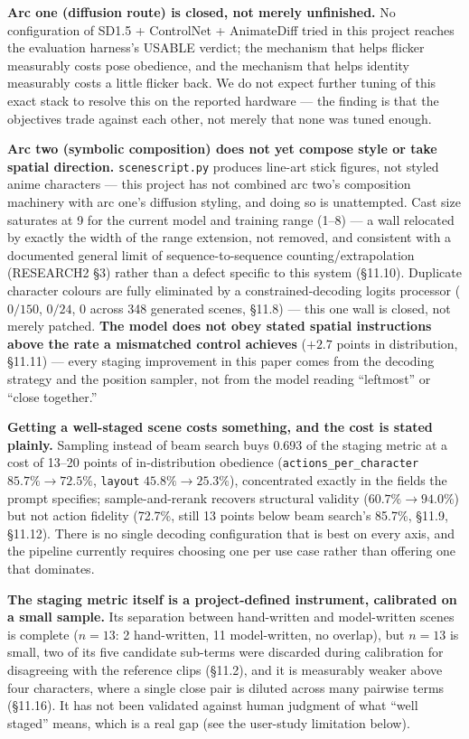 \documentclass[11pt]{article}
\newcommand{\secsym}{\S}
\begin{document}
\textbf{Arc one (diffusion route) is closed, not merely unfinished.} No
configuration of SD1.5 + ControlNet + AnimateDiff tried in this project
reaches the evaluation harness's USABLE verdict; the mechanism that helps
flicker measurably costs pose obedience, and the mechanism that helps
identity measurably costs a little flicker back. We do not expect further
tuning of this exact stack to resolve this on the reported hardware ---
the finding is that the objectives trade against each other, not merely
that none was tuned enough.

\textbf{Arc two (symbolic composition) does not yet compose style or
take spatial direction.} \texttt{scenescript.py} produces line-art stick
figures, not styled anime characters --- this project has not combined
arc two's composition machinery with arc one's diffusion styling, and
doing so is unattempted. Cast size saturates at 9 for the current model
and training range (1--8) --- a wall relocated by exactly the width of
the range extension, not removed, and consistent with a documented
general limit of sequence-to-sequence counting/extrapolation (RESEARCH2
\secsym3) rather than a defect specific to this system (\secsym11.10).
Duplicate character colours are fully eliminated by a
constrained-decoding logits processor ($0/150$, $0/24$, 0 across 348
generated scenes, \secsym11.8) --- this one wall is closed, not merely
patched. \textbf{The model does not obey stated spatial instructions
above the rate a mismatched control achieves} ($+2.7$ points in
distribution, \secsym11.11) --- every staging improvement in this paper
comes from the decoding strategy and the position sampler, not from the
model reading ``leftmost'' or ``close together.''

\textbf{Getting a well-staged scene costs something, and the cost is
stated plainly.} Sampling instead of beam search buys 0.693 of the
staging metric at a cost of 13--20 points of in-distribution obedience
(\texttt{actions\_per\_character} $85.7\% \rightarrow 72.5\%$,
\texttt{layout} $45.8\% \rightarrow 25.3\%$), concentrated exactly in the
fields the prompt specifies; sample-and-rerank recovers structural
validity ($60.7\% \rightarrow 94.0\%$) but not action fidelity (72.7\%,
still 13 points below beam search's 85.7\%, \secsym11.9, \secsym11.12).
There is no single decoding configuration that is best on every axis, and
the pipeline currently requires choosing one per use case rather than
offering one that dominates.

\textbf{The staging metric itself is a project-defined instrument,
calibrated on a small sample.} Its separation between hand-written and
model-written scenes is complete ($n=13$: 2 hand-written, 11
model-written, no overlap), but $n=13$ is small, two of its five
candidate sub-terms were discarded during calibration for disagreeing
with the reference clips (\secsym11.2), and it is measurably weaker
above four characters, where a single close pair is diluted across many
pairwise terms (\secsym11.16). It has not been validated against human
judgment of what ``well staged'' means, which is a real gap (see the
user-study limitation below).
\end{document}
